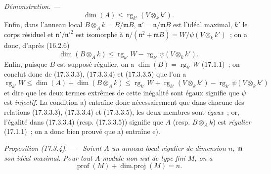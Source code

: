 \documentclass[10pt,oneside]{book}
\makeatletter
\newcommand{\setmanualcurrentlabel}[1]{\def\@currentlabel{#1}}
\newenvironment{proposition}[1][]{%
  \setmanualcurrentlabel{#1}\par\medskip\noindent\itshape Proposition (#1). ---\ }{\par}
\newenvironment{proof}{%
  \par\medskip\noindent\textit{Démonstration. ---\ }}{\par}
\makeatother
\begin{document}
\begin{proof}
\begin{equation}
\label{0.17.3.3.4-fr}
\tag{17.3.3.4}
  \dim(A)\leq\operatorname{rg}_{k'}(V\otimes_k k').
\end{equation}
Enfin, dans l'anneau local $B\otimes_A k=B/\mathfrak{m}B$,
$\mathfrak{n}'=\mathfrak{n}/\mathfrak{m}B$ est l'idéal maximal, $k'$ le corps
résiduel et $\mathfrak{n}'/\mathfrak{n}'^2$ est isomorphe à
$\mathfrak{n}/(\mathfrak{n}^2+\mathfrak{m}B)
=W/\psi(V\otimes_k k')$~; on a donc, d'après (16.2.6)
\begin{equation}
\label{0.17.3.3.5-fr}
\tag{17.3.3.5}
  \dim(B\otimes_A k)
  \leq\operatorname{rg}_{k'}W
  -\operatorname{rg}_{k'}\psi(V\otimes_k k').
\end{equation}
Enfin, puisque $B$ est supposé régulier, on a
$\dim(B)=\operatorname{rg}_{k'}W$ (17.1.1)~; on conclut donc de (17.3.3.3),
(17.3.3.4) et (17.3.3.5) que l'on a
\[
  \operatorname{rg}_{k'}W
  \leq\dim(A)+\dim(B\otimes_A k)
  \leq\operatorname{rg}_{k'}W
  +\operatorname{rg}_{k'}(V\otimes_k k')
  -\operatorname{rg}_{k'}\psi(V\otimes_k k')
\]
et dire que les deux termes extrêmes de cette inégalité sont égaux signifie
que $\psi$ est \emph{injectif}. La condition a) entraîne donc nécessairement
que dans chacune des relations (17.3.3.3), (17.3.3.4) et (17.3.3.5), les deux
membres sont \emph{égaux}~; or, l'égalité dans (17.3.3.4) (resp. (17.3.3.5))
signifie que $A$ (resp. $B\otimes_A k$) est \emph{régulier} (17.1.1)~; on a
donc bien prouvé que a) entraîne e).
\end{proof}

\begin{proposition}[17.3.4]
\label{0.17.3.4-fr}
Soient $A$ un anneau local régulier de dimension $n$, $\mathfrak{m}$ son idéal
maximal. Pour tout $A$-module non nul de type fini $M$, on a
\begin{equation}
\label{0.17.3.4.1-fr}
\tag{17.3.4.1}
  \operatorname{prof}(M)+\operatorname{dim.proj}(M)=n.
\end{equation}
\end{proposition}
\end{document}
